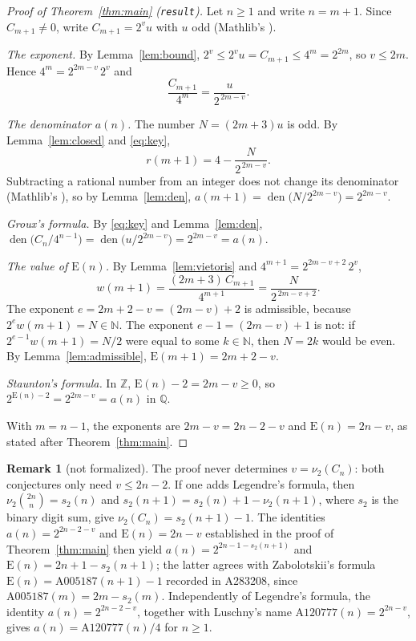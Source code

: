 \documentclass[11pt]{amsart}
\theoremstyle{plain}
\theoremstyle{definition}
\newtheorem{remark}[theorem]{Remark}
\newcommand{\code}[1]{\texttt{#1}}
\newcommand{\N}{\mathbb{N}}
\newcommand{\Z}{\mathbb{Z}}
\newcommand{\Q}{\mathbb{Q}}
\DeclareMathOperator{\den}{den}
\newcommand{\E}{\mathrm{E}}
\begin{document}
\begin{proof}[Proof of Theorem~\ref{thm:main} (\code{result})]
Let $n\ge1$ and write $n=m+1$. Since $C_{m+1}\ne0$, write $C_{m+1}=2^{v}u$ with $u$ odd (Mathlib's ).

\emph{The exponent.} By Lemma~\ref{lem:bound}, $2^{v}\le 2^vu=C_{m+1}\le 4^m=2^{2m}$, so $v\le 2m$. Hence $4^m=2^{2m-v}\,2^{v}$ and
\begin{equation}\label{eq:key}
  \frac{C_{m+1}}{4^{m}}=\frac{u}{2^{\,2m-v}} .
\end{equation}

\emph{The denominator $a(n)$.} The number $N=(2m+3)u$ is odd. By Lemma~\ref{lem:closed} and \eqref{eq:key},
\[
  r(m+1)=4-\frac{N}{2^{\,2m-v}} .
\]
Subtracting a rational number from an integer does not change its denominator (Mathlib's ), so by Lemma~\ref{lem:den}, $a(m+1)=\den\bigl(N/2^{2m-v}\bigr)=2^{2m-v}$.

\emph{Groux's formula.} By \eqref{eq:key} and Lemma~\ref{lem:den}, $\den\bigl(C_n/4^{n-1}\bigr)=\den\bigl(u/2^{2m-v}\bigr)=2^{2m-v}=a(n)$.

\emph{The value of $\E(n)$.} By Lemma~\ref{lem:vietoris} and $4^{m+1}=2^{2m-v+2}\,2^{v}$,
\[
  w(m+1)=\frac{(2m+3)\,C_{m+1}}{4^{m+1}}=\frac{N}{2^{\,2m-v+2}} .
\]
The exponent $e=2m+2-v=(2m-v)+2$ is admissible, because $2^{e}w(m+1)=N\in\N$. The exponent $e-1=(2m-v)+1$ is not: if $2^{e-1}w(m+1)=N/2$ were equal to some $k\in\N$, then $N=2k$ would be even. By Lemma~\ref{lem:admissible}, $\E(m+1)=2m+2-v$.

\emph{Staunton's formula.} In $\Z$, $\E(n)-2=2m-v\ge0$, so $2^{\E(n)-2}=2^{2m-v}=a(n)$ in $\Q$.

With $m=n-1$, the exponents are $2m-v=2n-2-v$ and $\E(n)=2n-v$, as stated after Theorem~\ref{thm:main}.
\end{proof}

\begin{remark}[not formalized]\label{rem:legendre}
The proof never determines $v=\nu_2(C_n)$: both conjectures only need $v\le 2n-2$. If one adds Legendre's formula, then $\nu_2\binom{2n}{n}=s_2(n)$ and $s_2(n+1)=s_2(n)+1-\nu_2(n+1)$, where $s_2$ is the binary digit sum, give $\nu_2(C_n)=s_2(n+1)-1$. The identities $a(n)=2^{2n-2-v}$ and $\E(n)=2n-v$ established in the proof of Theorem~\ref{thm:main} then yield $a(n)=2^{2n-1-s_2(n+1)}$ and $\E(n)=2n+1-s_2(n+1)$; the latter agrees with Zabolotskii's formula $\E(n)=\mathrm{A005187}(n+1)-1$ recorded in A283208, since $\mathrm{A005187}(m)=2m-s_2(m)$. Independently of Legendre's formula, the identity $a(n)=2^{2n-2-v}$, together with Luschny's name $\mathrm{A120777}(n)=2^{2n-v}$, gives $a(n)=\mathrm{A120777}(n)/4$ for $n\ge1$.
\end{remark}
\end{document}

